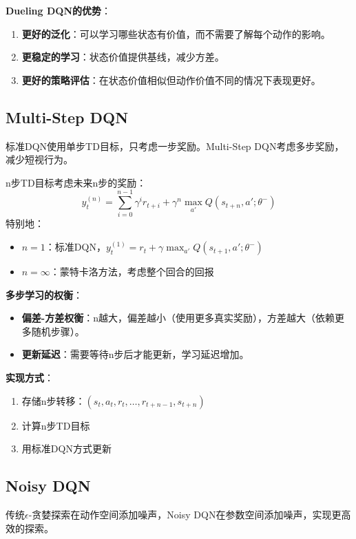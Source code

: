 \textbf{Dueling DQN的优势}：
\begin{enumerate}
    \item \textbf{更好的泛化}：可以学习哪些状态有价值，而不需要了解每个动作的影响。
    \item \textbf{更稳定的学习}：状态价值提供基线，减少方差。
    \item \textbf{更好的策略评估}：在状态价值相似但动作价值不同的情况下表现更好。
\end{enumerate}

\subsection{Multi-Step DQN}

标准DQN使用单步TD目标，只考虑一步奖励。Multi-Step DQN考虑多步奖励，减少短视行为。

\begin{definition}[n步TD目标]
n步TD目标考虑未来n步的奖励：
\[
y_t^{(n)} = \sum_{i=0}^{n-1} \gamma^i r_{t+i} + \gamma^n \max_{a'} Q(s_{t+n}, a'; \theta^-)
\]
特别地：
\begin{itemize}
    \item $n=1$：标准DQN，$y_t^{(1)} = r_t + \gamma \max_{a'} Q(s_{t+1}, a'; \theta^-)$
    \item $n=\infty$：蒙特卡洛方法，考虑整个回合的回报
\end{itemize}
\end{definition}

\textbf{多步学习的权衡}：
\begin{itemize}
    \item \textbf{偏差-方差权衡}：n越大，偏差越小（使用更多真实奖励），方差越大（依赖更多随机步骤）。
    \item \textbf{更新延迟}：需要等待n步后才能更新，学习延迟增加。
\end{itemize}

\textbf{实现方式}：
\begin{enumerate}
    \item 存储n步转移：$(s_t, a_t, r_t, \ldots, r_{t+n-1}, s_{t+n})$
    \item 计算n步TD目标
    \item 用标准DQN方式更新
\end{enumerate}

\subsection{Noisy DQN}

传统$\epsilon$-贪婪探索在动作空间添加噪声，Noisy DQN在参数空间添加噪声，实现更高效的探索。

